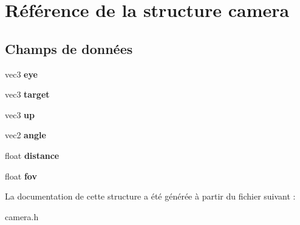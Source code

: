 \hypertarget{structcamera}{\section{Référence de la structure camera}
\label{structcamera}
}
\subsection*{Champs de données}
\begin{DoxyCompactItemize}
\item 
\hypertarget{structcamera_a59c7cca5ec718e42f0b3d58b033932c1}{vec3 {\bfseries eye}}\label{structcamera_a59c7cca5ec718e42f0b3d58b033932c1}

\item 
\hypertarget{structcamera_a71f586eb04bc4185d0d3c4c366e63896}{vec3 {\bfseries target}}\label{structcamera_a71f586eb04bc4185d0d3c4c366e63896}

\item 
\hypertarget{structcamera_af25e132b20481c5c82d8394e0beeea4a}{vec3 {\bfseries up}}\label{structcamera_af25e132b20481c5c82d8394e0beeea4a}

\item 
\hypertarget{structcamera_a4a261f99dfaa5397faf5fc9eba20218b}{vec2 {\bfseries angle}}\label{structcamera_a4a261f99dfaa5397faf5fc9eba20218b}

\item 
\hypertarget{structcamera_a06f14a9abd47b91465f895d5259cdc1b}{float {\bfseries distance}}\label{structcamera_a06f14a9abd47b91465f895d5259cdc1b}

\item 
\hypertarget{structcamera_abfd94a01fc71278021802ca0d1e25e16}{float {\bfseries fov}}\label{structcamera_abfd94a01fc71278021802ca0d1e25e16}

\end{DoxyCompactItemize}


La documentation de cette structure a été générée à partir du fichier suivant \-:\begin{DoxyCompactItemize}
\item 
camera.\-h\end{DoxyCompactItemize}

